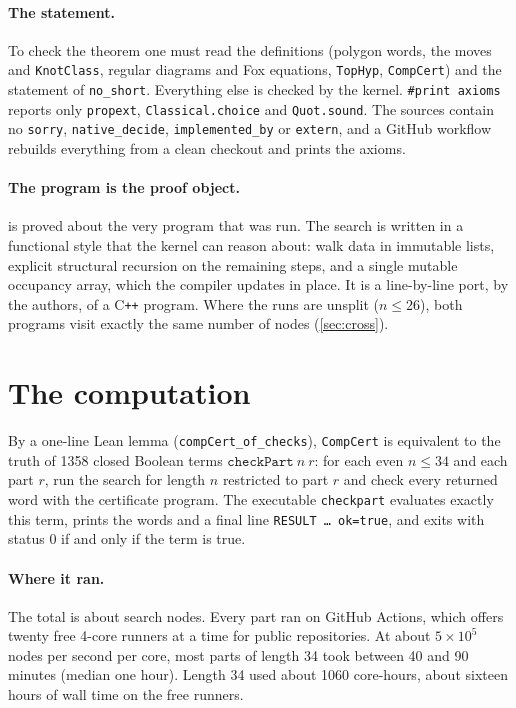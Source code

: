 \documentclass[11pt]{article}
\theoremstyle{plain}
\theoremstyle{definition}
\theoremstyle{remark}
\newcommand{\lean}[1]{\texttt{#1}}
\begin{document}
\paragraph{The statement.} To check the theorem one must read the definitions (polygon words, the moves
and \lean{KnotClass}, regular diagrams and Fox equations, \lean{TopHyp}, \lean{CompCert}) and the
statement of \lean{no\_short}. Everything else is checked by the kernel. \lean{\#print axioms} reports
only \lean{propext}, \lean{Classical.choice} and \lean{Quot.sound}. The sources contain no
\lean{sorry}, \lean{native\_decide}, \lean{implemented\_by} or \lean{extern}, and a GitHub workflow
rebuilds everything from a clean checkout and prints the axioms.

\paragraph{The program is the proof object.}  is proved about the very program
that was run. The search is written in a functional style that the kernel can reason about: walk data
in immutable lists, explicit structural recursion on the remaining steps, and a single mutable occupancy
array, which the compiler updates in place. It is a line-by-line port, by the authors, of a
C\texttt{++} program. Where the runs are unsplit ($n\le26$), both programs visit exactly the same number
of nodes (\cref{sec:cross}).

\section{The computation}\label{sec:engineering}

By a one-line Lean lemma (\lean{compCert\_of\_checks}), \lean{CompCert} is equivalent to the truth of
\num{1358} closed Boolean terms $\mathtt{checkPart}\ n\ r$: for each even $n\le34$ and each part $r$,
run the search for length $n$ restricted to part $r$ and check every returned word with the
certificate program. The executable \texttt{checkpart} evaluates exactly this term, prints the words and
a final line \texttt{RESULT \dots\ ok=true}, and exits with status $0$ if and only if the term is true.

\paragraph{Where it ran.} The total is about \NNodes{} search nodes. Every part ran on GitHub Actions,
which offers twenty free 4-core runners at a time for public repositories.
At about $5\times10^5$ nodes per second per core, most parts of length 34 took between 40 and 90
minutes (median one hour). Length 34 used about 1060 core-hours, about sixteen hours of wall time on the
free runners.
\end{document}
